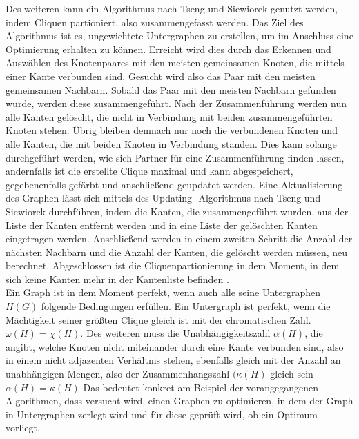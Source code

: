 \documentclass[conference]{IEEEtran}
\begin{document}
Des weiteren kann ein Algorithmus nach Tseng und
Siewiorek genutzt werden, indem Cliquen partioniert, also
zusammengefasst werden. Das Ziel des Algorithmus ist es,
ungewichtete Untergraphen zu erstellen, um im Anschluss eine
Optimierung erhalten zu können\cite[S. 247]{3}.
Erreicht wird dies
durch das Erkennen und Auswählen des Knotenpaares mit den
meisten gemeinsamen Knoten, die mittels einer Kante verbunden
sind. Gesucht wird also das Paar mit den meisten gemeinsamen
Nachbarn. Sobald das Paar mit den meisten Nachbarn
gefunden wurde, werden diese zusammengeführt. Nach der
Zusammenführung werden nun alle Kanten gelöscht, die nicht
in Verbindung mit beiden zusammengeführten Knoten stehen.
Übrig bleiben demnach nur noch die verbundenen Knoten und
alle Kanten, die mit beiden Knoten in Verbindung standen.
Dies kann solange durchgeführt werden, wie sich Partner
für eine Zusammenführung finden lassen, andernfalls ist die
erstellte Clique maximal und kann abgespeichert, gegebenenfalls
gefärbt und anschließend geupdatet werden. Eine
Aktualisierung des Graphen lässt sich mittels des Updating-
Algorithmus nach Tseng und Siewiorek\cite[S.393]{5} durchführen,
indem die Kanten, die zusammengeführt wurden, aus der Liste
der Kanten entfernt werden und in eine Liste der gelöschten
Kanten eingetragen werden. Anschließend werden in einem
zweiten Schritt die Anzahl der nächsten Nachbarn und die Anzahl
der Kanten, die gelöscht werden müssen, neu berechnet.
Abgeschlossen ist die Cliquenpartionierung in dem Moment,
in dem sich keine Kanten mehr in der Kantenliste befinden \cite[S.248]{3}\cite[S.392-393]{5}.\\
Ein Graph ist in dem Moment perfekt, wenn auch alle seine Untergraphen $H(G)$ folgende Bedingungen erfüllen. Ein Untergraph ist perfekt, wenn die Mächtigkeit seiner größten Clique gleich ist mit der chromatischen Zahl. $\omega(H) = \chi(H)$. Des weiteren muss die Unabhängigkeitszahl $ \alpha(H)$, die angibt, welche Knoten nicht miteinander durch eine Kante verbunden sind, also in einem nicht adjazenten Verhältnis stehen, ebenfalls gleich mit der Anzahl an unabhängigen Mengen, also der Zusammenhangszahl $(\kappa(H)$ gleich sein $\alpha(H) = \kappa(H)$\cite[S.507]{1}\cite[S.59 - 60 ]{6} Das bedeutet konkret am Beispiel der vorangegangenen Algorithmen, dass versucht wird, einen Graphen zu optimieren, in dem der Graph in Untergraphen zerlegt wird und für diese geprüft wird, ob ein Optimum vorliegt.
\end{document}
